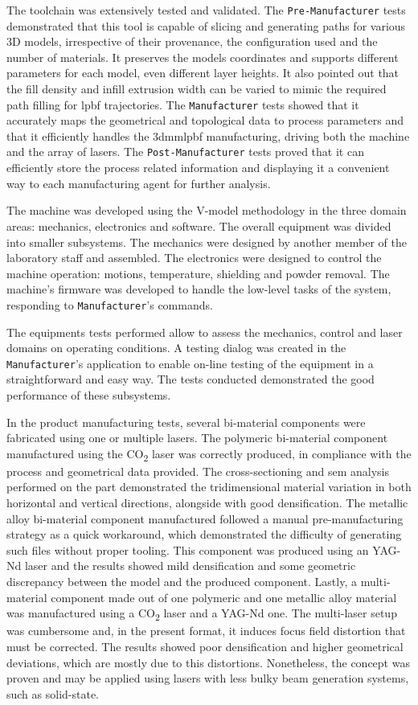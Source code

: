 The toolchain was extensively tested and validated. The \texttt{Pre-Manufacturer} tests
demonstrated that this tool is capable of slicing and generating paths for
various 3D models, irrespective of their provenance, the configuration used and the
number of materials. It preserves the models coordinates and supports different
parameters for each model, even different layer heights.
It also
pointed out that the fill density and infill extrusion width can be varied to
mimic the required path filling for \gls{lpbf} trajectories.
The \texttt{Manufacturer} tests showed that it accurately maps the geometrical
and topological data to process parameters and that it efficiently handles the
\gls{3dmmlpbf} manufacturing, driving both the machine and the array of
lasers. The \texttt{Post-Manufacturer} tests proved that it can efficiently
store the process related information and displaying it a convenient way to each
manufacturing agent for further analysis.

The machine was developed using the V-model methodology in the three domain
areas: mechanics, electronics and software. The overall equipment was divided
into smaller subsystems. The mechanics were designed by another member of the
laboratory staff and assembled. The electronics were designed to control the
machine operation: motions, temperature, shielding and powder removal. The
machine's firmware was developed to handle the low-level tasks of the system,
responding to \texttt{Manufacturer}'s commands.

The equipments tests performed allow to assess the mechanics, control and laser
domains on operating conditions. A testing dialog was created in the
\texttt{Manufacturer}'s application to enable on-line testing of the equipment
in a straightforward and easy way. 
The tests conducted demonstrated the good performance of these subsystems.

In the product manufacturing tests, several bi-material components were
fabricated using one or multiple lasers. The polymeric bi-material component manufactured
using the CO\textsubscript{2} laser was
correctly produced, in compliance with the process and geometrical data
provided. The cross-sectioning and \gls{sem} analysis performed on the part
demonstrated the tridimensional material variation in both horizontal and
vertical directions, alongside with good densification. The metallic alloy
bi-material component manufactured followed a manual pre-manufacturing
strategy as a quick workaround, which demonstrated the difficulty of generating
such files without proper tooling. This component was produced using an YAG-Nd
laser and the results showed mild densification and
some geometric discrepancy between the model and the produced component.
Lastly, a multi-material component made out of one polymeric and one metallic alloy
material was manufactured using a CO\textsubscript{2} laser and a YAG-Nd
one. The multi-laser setup was cumbersome and, in the present format, it induces
focus field distortion that must be corrected. The results showed poor
densification and higher geometrical deviations, which are mostly due to this
distortions. Nonetheless, the concept was proven and may be applied using lasers
with less bulky beam generation systems, such as solid-state.

